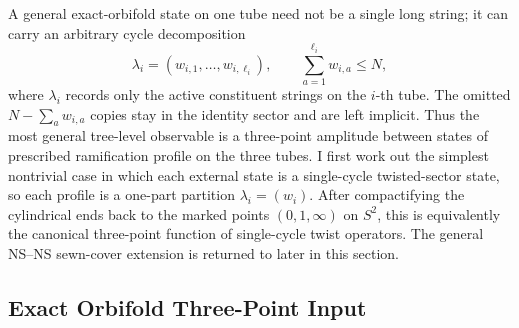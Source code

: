 \documentclass[11pt]{article}
\begin{document}
A general exact-orbifold state on one tube need not be a single long string; it can carry an arbitrary cycle decomposition
\begin{equation}\label{eq:ramification-profile}
\lambda_i=(w_{i,1},\dots,w_{i,\ell_i}),
\qquad
\sum_{a=1}^{\ell_i} w_{i,a}\le N,
\end{equation}
where $\lambda_i$ records only the active constituent strings on the $i$-th tube. The omitted $N-\sum_a w_{i,a}$ copies stay in the identity sector and are left implicit.
Thus the most general tree-level observable is a three-point amplitude between states of prescribed ramification profile on the three tubes. I first work out the simplest nontrivial case in which each external state is a single-cycle twisted-sector state, so each profile is a one-part partition $\lambda_i=(w_i)$. After compactifying the cylindrical ends back to the marked points $(0,1,\infty)$ on $S^2$, this is equivalently the canonical three-point function of single-cycle twist operators. The general NS--NS sewn-cover extension is returned to later in this section.

\subsection{Exact Orbifold Three-Point Input}
\end{document}
